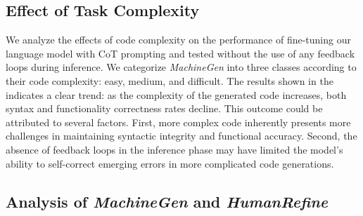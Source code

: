 \subsection{Effect of Task Complexity}\label{subsec:complexity}
We analyze the effects of code complexity on the performance of fine-tuning our language model with CoT prompting and tested without the use of any feedback loops during inference. 
We categorize \textit{MachineGen} into three classes according to their code complexity: easy, medium, and difficult.
The results shown in the  indicates a clear trend: as the complexity of the generated code increases, both syntax and functionality correctness rates decline. This outcome could be attributed to several factors. First, more complex code inherently presents more challenges in maintaining syntactic integrity and functional accuracy. Second, the absence of feedback loops in the inference phase may have limited the model's ability to self-correct emerging errors in more complicated code generations.

\begin{table}[h]
\centering
\caption{Performance across different complexity levels.}
\label{tab:model_performance}
\end{table}

\subsection{Analysis of \textit{MachineGen} and \textit{HumanRefine}}
\begin{table}[h]
\centering
\caption{Performance on \textit{MachineGen} and \textit{HumanRefine}.}
\vspace{-3mm}
\label{table:eval_comparison}
\end{table}

